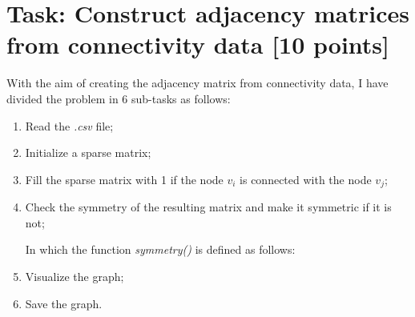 \documentclass[unicode,11pt,a4paper,oneside,numbers=endperiod,openany]{scrartcl}
\begin{document}
\setassignment
{}

\newline

\assignmentpolicy

\section{Task:  Construct adjacency matrices
from connectivity data [10 points]}

With the aim of creating the adjacency matrix from connectivity data, I have divided the problem in  6 sub-tasks as follows:
\begin{enumerate}
	\item Read the \textit{.csv} file;
	
	
	\item Initialize a sparse matrix;
	

	\item Fill the sparse matrix with 1 if the node $v_i$ is connected with the node $v_j$;
	
	
	\item Check the symmetry of the resulting matrix and make it symmetric if it is not;
	
	In which the function \textit{symmetry()} is defined as follows:
	
	
	\item Visualize the graph;
	
	
	\item Save the graph.
	
\end{enumerate}
\end{document}
